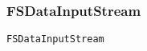 
\subsubsection{FSDataInputStream}
\label{sec:uml:input:fsdatainputstream}

\lstinline{FSDataInputStream}
